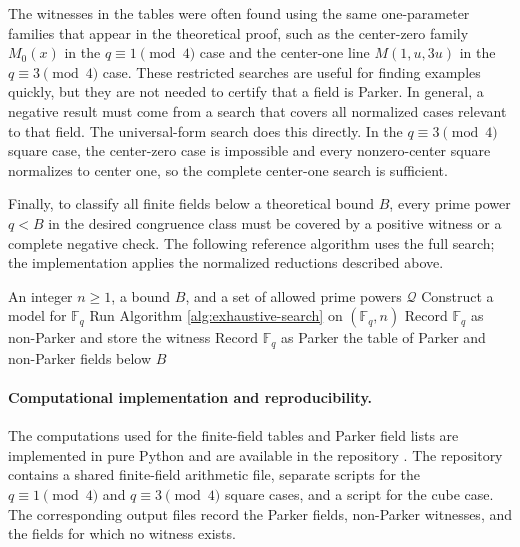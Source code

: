 \documentclass{article}
\newcommand{\F}{\mathbb F}
\theoremstyle{definition}
\numberwithin{equation}{section}
\begin{document}
The witnesses in the tables were often found using the same one-parameter
families that appear in the theoretical proof, such as the center-zero family
\(M_0(x)\) in the \(q\equiv1\pmod4\) case and the center-one line
\(M(1,u,3u)\) in the \(q\equiv3\pmod4\) case.  These restricted searches are
useful for finding examples quickly, but they are not needed to certify that a
field is Parker.  In general, a negative result must come from a search that covers all normalized
cases relevant to that field. The universal-form search does this directly. In
the \(q\equiv3\pmod4\) square case, the center-zero case is impossible and every
nonzero-center square normalizes to center one, so the complete center-one search
is sufficient.

Finally, to classify all finite fields below a theoretical bound \(B\), every
prime power \(q<B\) in the desired congruence class must be covered by a
positive witness or a complete negative check. The following reference
algorithm uses the full search; the implementation applies the normalized
reductions described above.

\begin{algorithm}[H]
\caption{Finite-field classification below a bound}
\label{alg:field-classification}
\begin{algorithmic}[1]
\Require An integer \(n\geq 1\), a bound \(B\), and a set of allowed prime powers \(\mathcal Q\)
    \State Construct a model for \(\F_q\)
    \State Run Algorithm \ref{alg:exhaustive-search} on \((\F_q,n)\)
        \State Record \(\F_q\) as non-Parker and store the witness
    \Else
        \State Record \(\F_q\) as Parker
    \EndIf
\EndFor
\State \Return the table of Parker and non-Parker fields below \(B\)
\end{algorithmic}
\end{algorithm}

\paragraph{Computational implementation and reproducibility.}
The computations used for the finite-field tables and Parker field lists are implemented in pure Python and are available in the repository \cite{magicSquaresFieldsRepo}.  The repository contains a shared finite-field arithmetic file, separate scripts for the \(q\equiv1\pmod4\) and \(q\equiv3\pmod4\) square cases, and a script for the cube case.  The corresponding output files record the Parker fields, non-Parker witnesses, and the fields for which no witness exists.
\end{document}
